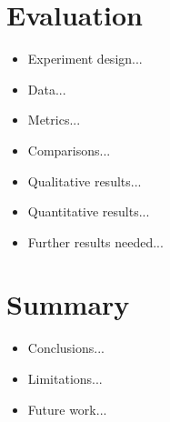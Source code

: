 \documentclass[pageno]{jpaper}
\begin{document}
\section{Evaluation}
\begin{itemize}
\item Experiment design...
\item Data...
\item Metrics...
\item Comparisons...
\item Qualitative results...
\item Quantitative results...
\item Further results needed...
\end{itemize}

\section{Summary}
\begin{itemize}
\item Conclusions...
\item Limitations...
\item Future work...
\end{itemize}




\end{document}
